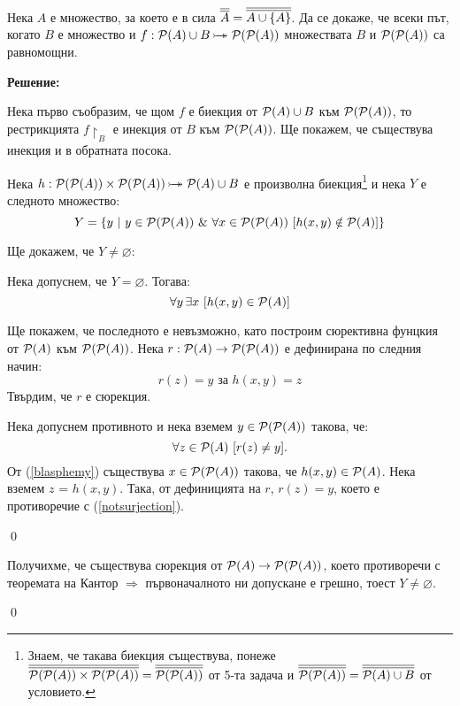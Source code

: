 \begin{problem}
Нека $A$ е множество, за което е в сила $\overline{\overline{A}} = \overline{\overline{A \cup \{A\}}}$.
Да се докаже, че всеки път, когато $B$ е множество и $f: \pow(A) \cup B \bijarrow \pow(\pow(A))$
множествата $B$ и $\mathcal{P}(\mathcal{P}(A))$ са равномощни.
\end{problem}

\textbf{Решение:}

\smallbreak
\quad
Нека първо съобразим, че щом $f$ е биекция от $\mathcal{P}(A) \cup B$ към $\mathcal{P}(\mathcal{P}(A))$,
то рестрикцията $f\restriction_B$ е инекция от $B$ към $\mathcal{P}(\mathcal{P}(A))$.
Ще покажем, че съществува инекция и в обратната посока.

\quad
Нека $h: \pow(\pow(A)) \times \pow(\pow(A)) \bijarrow \pow(A) \cup B$ е произволна биекция\footnote[2]{Знаем, че такава биекция съществува, понеже
$\overline{\overline{\mathcal{P}(\mathcal{P}(A)) \times \mathcal{P}(\mathcal{P}(A))}} = \overline{\overline{\mathcal{P}(\mathcal{P}(A))}}$ от 5-та задача и $\overline{\overline{\mathcal{P}(\mathcal{P}(A))}} = \overline{\overline{\mathcal{P}(A) \cup B}}$ от условието.}
и нека $Y$ е следното множество:
\[
Y = \{y\ |\ y \in \mathcal{P}(\mathcal{P}(A)) \ \&\  \forall x \in \mathcal{P}(\mathcal{P}(A))\ [h(x, y) \notin \mathcal{P}(A)]\}
\]

\quad
Ще докажем, че $Y \ne \varnothing$:
\begin{tcolorbox}[mybox={Доказателство:}]
\quad
Нека допуснем, че $Y = \varnothing$. Тогава:
\begin{equation}\label{blasphemy}
\forall y\, \exists x\ [h(x, y) \in \mathcal{P}(A)]
\end{equation}

\quad
Ще покажем, че последното е невъзможно, като построим сюрективна фунцкия от $\mathcal{P}(A)$ към $\mathcal{P}(\mathcal{P}(A))$.
Нека $r: \mathcal{P}(A) \to \mathcal{P}(\mathcal{P}(A))$ е дефинирана по следния начин:
\[
r(z) = y \text{ за } h(x, y) = z
\]
\quad
Твърдим, че $r$ е сюрекция.

\begin{tcolorbox}[mybox={Доказателство:}, colback=green!20, colframe=green!60]
\quad
Нека допуснем противното и нека вземем $y \in \mathcal{P}(\mathcal{P}(A))$ такова, че:
\begin{equation}\label{notsurjection}
\forall z \in \mathcal{P}(A)\ [r(z) \ne y].
\end{equation}
\quad
От (\ref{blasphemy}) съществува $x \in \mathcal{P}(\mathcal{P}(A))$ такова, че $h(x, y) \in \mathcal{P}(A)$.
Нека вземем $z$ = $h(x, y)$.
Така, от дефиницията на $r$, $r(z) = y$, което е противоречие с (\ref{notsurjection}).

\qed
\end{tcolorbox}

\quad
Получихме, че съществува сюрекция от $\mathcal{P}(A) \to \mathcal{P}(\mathcal{P}(A))$,
което противоречи с теоремата на Кантор $\Rightarrow$ първоначалното ни допускане е грешно, тоест $Y \ne \varnothing$.


\qed

\end{tcolorbox}

